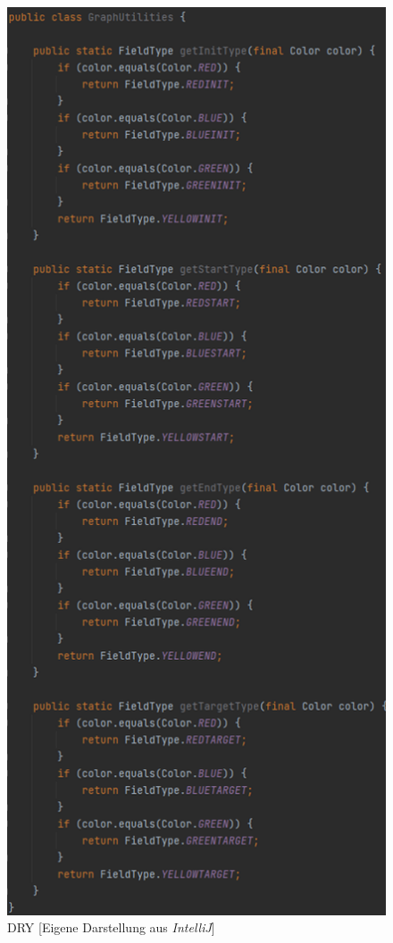 \begin{figure}[htbp]
\centering
\centerline{\includegraphics[scale=.6]{dry1}}
\caption{DRY [Eigene Darstellung aus \emph{IntelliJ}]}
\label{fig:dry1}
\end{figure}

